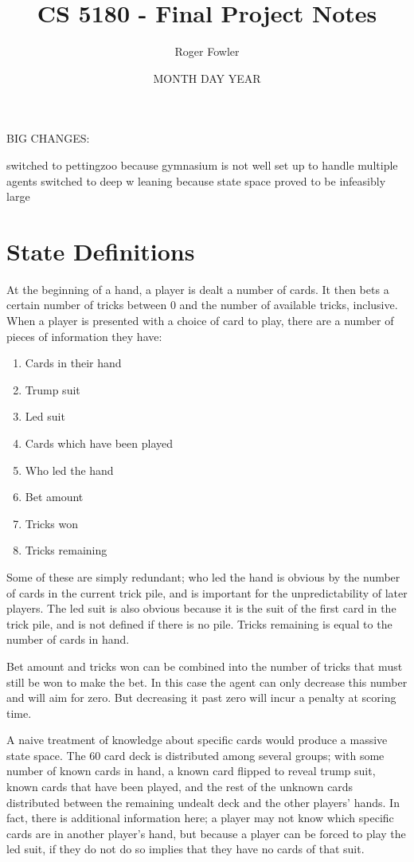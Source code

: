 \documentclass[10pt]{article} %
\title{\vspace{-2cm}CS 5180 - Final Project Notes}
\author{Roger Fowler}
\date{MONTH DAY YEAR}
\begin{document}
\maketitle

BIG CHANGES:

switched to pettingzoo because gymnasium is not well set up to handle multiple agents
switched to deep w leaning because state space proved to be infeasibly large

\section{State Definitions}

At the beginning of a hand, a player is dealt a number of cards. It then bets a certain number of tricks between 0 and the number of available tricks, inclusive. When a player is presented with a choice of card to play, there are a number of pieces of information they have:

\begin{enumerate}
\item Cards in their hand
\item Trump suit
\item Led suit
\item Cards which have been played
\item Who led the hand
\item Bet amount
\item Tricks won
\item Tricks remaining
\end{enumerate}

Some of these are simply redundant; who led the hand is obvious by the number of cards in the current trick pile, and is important for the unpredictability of later players. The led suit is also obvious because it is the suit of the first card in the trick pile, and is not defined if there is no pile. Tricks remaining is equal to the number of cards in hand.

Bet amount and tricks won can be combined into the number of tricks that must still be won to make the bet. In this case the agent can only decrease this number and will aim for zero. But decreasing it past zero will incur a penalty at scoring time.

A naive treatment of knowledge about specific cards would produce a massive state space. The 60 card deck is distributed among several groups; with some number of known cards in hand, a known card flipped to reveal trump suit, known cards that have been played, and the rest of the unknown cards distributed between the remaining undealt deck and the other players’ hands. In fact, there is additional information here; a player may not know which specific cards are in another player’s hand, but because a player can be forced to play the led suit, if they do not do so implies that they have no cards of that suit.
\end{document}
